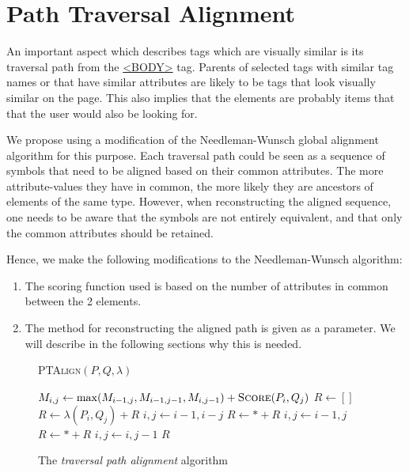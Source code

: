 \section{Path Traversal Alignment}
An important aspect which describes tags which are visually similar is its traversal path from
the \url{<BODY>} tag. Parents of selected tags with similar tag names or that have similar
attributes are likely to be tags that look visually similar on the page. This also implies that
 the elements are probably items that that the user would also be looking for.

We propose using a modification of the Needleman-Wunsch \cite{Needleman1970} global alignment algorithm for this
purpose. Each traversal path could be seen as a sequence of symbols that need to be aligned
based on their common attributes. The more attribute-values they have in common, the more
likely they are ancestors of elements of the same type. However, when reconstructing the
aligned sequence, one needs to be aware that the symbols are not entirely equivalent, and that
only the common attributes should be retained.

Hence, we make the following modifications to the Needleman-Wunsch algorithm:
\begin{enumerate}
	\item The scoring function used is based on the number of attributes in common
	between the 2 elements.
	\item The method for reconstructing the aligned path is given as a parameter. We will
	describe in the following sections why this is needed.
\end{enumerate}

\begin{figure}[htbp]
\singlespacing
	\begin{algorithm}[H]
	\caption{\textsc{PTAlign}$(P,Q,\lambda)$}
	\begin{algorithmic}[1]
				\STATE $M_{i,j} \leftarrow \max(M_{i-1,j},M_{i-1,j-1},M_{i,j-1}) + \textsc{Score}(P_i,Q_j)$
			\ENDFOR	
		\ENDFOR
		\STATE $R \leftarrow []$
				\STATE $R \leftarrow \lambda(P_i,Q_j) + R$
				\STATE $i,j \leftarrow i-1,i-j$
				\STATE $R \leftarrow * + R$
				\STATE $i,j \leftarrow i-1,j$
				\STATE $R \leftarrow * + R$
				\STATE $i,j \leftarrow i,j-1$
	    	\ENDIF	
		\ENDWHILE
		\RETURN $R$
	\end{algorithmic}
	\end{algorithm}
\caption{The \textit{traversal path alignment} algorithm}
\label{fig:lcas}
\end{figure}

